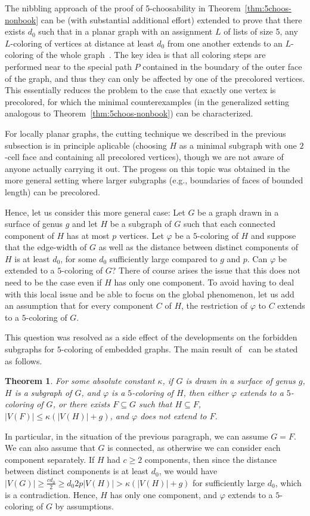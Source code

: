 \documentclass[12pt,twoside,openright,a4paper]{book}
\newtheorem{theorem}{Theorem}[chapter]
\begin{document}
The nibbling approach of the proof of 5-choosability in Theorem~\ref{thm:5choos-nonbook} can be (with substantial additional effort)
extended to prove that there exists $d_0$ such that in a planar graph with an assignment $L$ of lists of size 5, any $L$-coloring
of vertices at distance at least $d_0$ from one another extends to an $L$-coloring of the whole graph~\cite{LidDvoMohPos}.
The key idea is that all coloring steps are performed near to the special path $P$ contained in the boundary of the outer face
of the graph, and thus they can only be affected by one of the precolored vertices.  This essentially reduces the problem
to the case that exactly one vertex is precolored, for which the minimal counterexamples (in the generalized setting analogous
to Theorem~\ref{thm:5choos-nonbook}) can be characterized.

For locally planar graphs, the cutting technique we described in the previous subsection is in principle aplicable
(choosing $H$ as a minimal subgraph with one $2$-cell face and containing all precolored vertices), though we are
not aware of anyone actually carrying it out.  The progess on this topic was obtained in the more general setting
where larger subgraphs (e.g., boundaries of faces of bounded length) can be precolored.

Hence, let us consider this more general case: Let $G$ be a graph drawn in a surface of genus $g$ and let $H$
be a subgraph of $G$ such that each connected component of $H$ has at most $p$ vertices.  Let $\varphi$ be a $5$-coloring
of $H$ and suppose that the edge-width of $G$ as well as the distance between distinct components of $H$ is at least $d_0$,
for some $d_0$ sufficiently large compared to $g$ and $p$.  Can $\varphi$ be extended to a $5$-coloring of $G$?
There of course arises the issue that this does not need to be the case even if $H$ has only one component.
To avoid having to deal with this local issue and be able to focus on the global phenomenon, let us add
an assumption that for every component $C$ of $H$, the restriction of $\varphi$ to $C$ extends to a $5$-coloring of $G$.

This question was resolved as a side effect of the developments on the forbidden subgraphs for $5$-coloring of embedded graphs.
The main result of~\cite{pothom} can be stated as follows.
\begin{theorem}\label{thm:5hyperbol}
For some absolute constant $\kappa$, if $G$ is drawn in a surface of genus $g$, $H$ is a subgraph of $G$, and
$\varphi$ is a $5$-coloring of $H$, then either $\varphi$ extends to a $5$-coloring of $G$, or there exists
$F\subseteq G$ such that $H\subseteq F$, $|V(F)|\le \kappa(|V(H)|+g)$, and $\varphi$ does not extend to $F$.
\end{theorem}
In particular, in the situation of the previous paragraph, we can assume $G=F$.  We can also assume that $G$ is
connected, as otherwise we can consider each component separately.  If $H$ had $c\ge 2$ components, then since the distance between
distinct components is at least $d_0$, we would have $|V(G)|\ge \tfrac{cd_0}{2}\ge {d_0}{2p}|V(H)|>\kappa(|V(H)|+g)$
for sufficiently large $d_0$, which is a contradiction.  Hence, $H$ has only one component, and $\varphi$ extends to a $5$-coloring of $G$
by assumptions.
\end{document}

